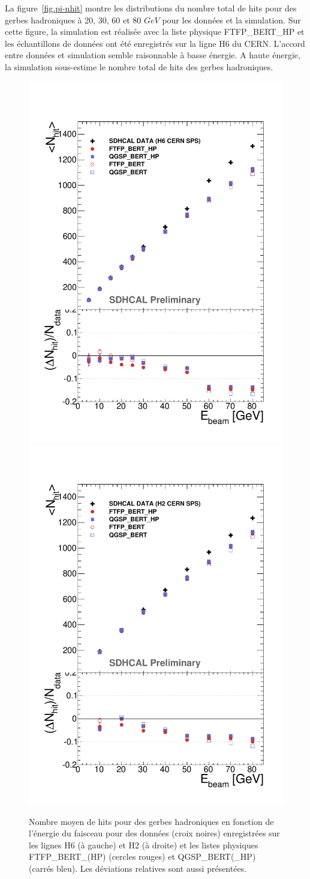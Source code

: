 La figure~\ref{fig.pi-nhit} montre les distributions du nombre total de hits pour des gerbes hadroniques à 20, 30, 60 et 80 $GeV$ pour les données et la simulation. Sur cette figure, la simulation est réalisée avec la liste physique FTFP\_BERT\_HP et les échantillons de données ont été enregistrés sur la ligne H6 du CERN. L'accord entre données et simulation semble raisonnable à basse énergie. A haute énergie, la simulation sous-estime le nombre total de hits des gerbes hadroniques.
\begin{figure}[!ht]
  \includegraphics[width=.5\textwidth]{Digitizer/figs/NHITPIONHP.pdf}
  \includegraphics[width=.5\textwidth]{Digitizer/figs/NHITPION_NOV_HP.pdf}
  \caption{Nombre moyen de hits pour des gerbes hadroniques en fonction de l'énergie du faisceau pour des données (croix noires) enregistrées sur les lignes H6 (à gauche) et H2 (à droite) et les listes physiques FTFP\_BERT\_(HP) (cercles rouges) et QGSP\_BERT(\_HP) (carrés bleu). Les déviations relatives sont aussi présentées.}
  \label{fig.nhit_pi-_ebeam}
\end{figure}
